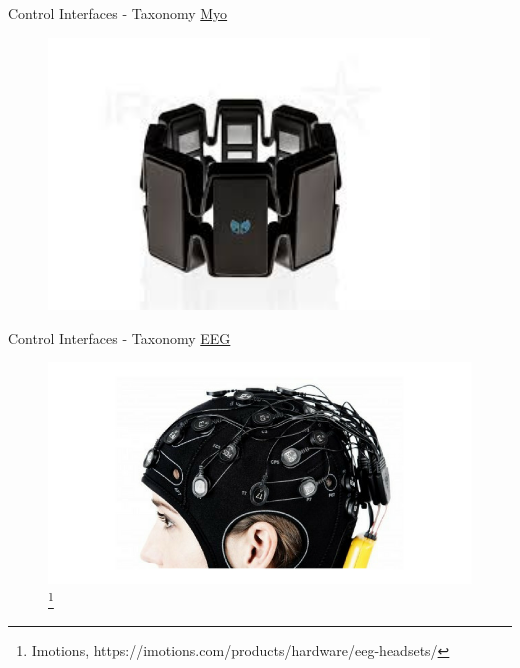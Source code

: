 \documentclass{beamer}
\newcommand\blfootnote[1]{%
  \begingroup
  \renewcommand\thefootnote{}\footnote{#1}%
  \addtocounter{footnote}{-1}%
  \endgroup
}
\begin{document}
\begin{frame}{Control Interfaces - Taxonomy}
    \href{https://www.youtube.com/watch?v=G6H1J2k--5I}{Myo}
    \begin{figure}[h]
        \includegraphics[width=0.9\textwidth]{myo.jpeg}
    \end{figure}
\end{frame}


\begin{frame}{Control Interfaces - Taxonomy}
    \href{https://www.youtube.com/watch?v=7YyNrtKTjnA}{EEG}
    \begin{figure}[h]
        \includegraphics[width=\textwidth]{eeg.png}\blfootnote{Imotions, https://imotions.com/products/hardware/eeg-headsets/}
    \end{figure}
\end{frame}
\end{document}
